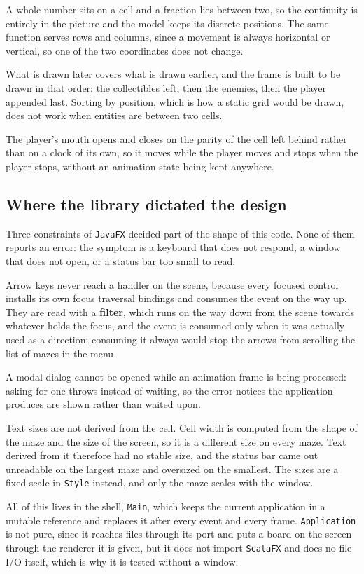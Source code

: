 A whole number sits on a cell and a fraction lies between two, so the continuity is entirely in the picture and the
model keeps its discrete positions. The same function serves rows and columns, since a movement is always horizontal or vertical, so one of the two coordinates does not change.

What is drawn later covers what is drawn earlier, and the frame is built to be drawn in that order: the collectibles left,
then the enemies, then the player appended last. Sorting by position, which is how a static grid would be
drawn, does not work when entities are between two cells.

The player's mouth opens and closes on the parity of the cell left behind rather than on a clock of its own, so it moves while the player moves and stops when the player stops, without an animation state being kept anywhere.

\subsection{Where the library dictated the design}

Three constraints of \texttt{JavaFX} decided part of the shape of this code. None of them reports an error: the
symptom is a keyboard that does not respond, a window that does not open, or a status bar too small to read.

Arrow keys never reach a handler on the scene, because every focused control installs its own focus traversal
bindings and consumes the event on the way up. They are read with a \textbf{filter}, which runs on the way down from
the scene towards whatever holds the focus, and the event is consumed only when it was actually used as a direction:
consuming it always would stop the arrows from scrolling the list of mazes in the menu.

A modal dialog cannot be opened while an animation frame is being processed: asking for one throws instead of
waiting, so the error notices the application produces are shown rather than waited upon.

Text sizes are not derived from the cell. Cell width is computed from the shape of the maze and the size of the
screen, so it is a different size on every maze. Text derived from it therefore had no stable size, and the status bar
came out unreadable on the largest maze and oversized on the smallest. The sizes are a fixed scale in \texttt{Style}
instead, and only the maze scales with the window.

All of this lives in the shell, \texttt{Main}, which keeps the current application in a mutable reference and replaces it after every
event and every frame. \texttt{Application} is not pure, since it reaches files through its port and puts a board on the
screen through the renderer it is given, but it does not import \texttt{ScalaFX} and does no file I/O itself, which is why it is
tested without a window.

